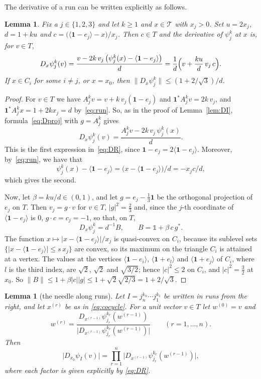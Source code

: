 \documentclass[11pt]{amsart}
\newcommand{\id}{\mathds{1}}
\newtheorem{lemma}[proposition]{Lemma}
\theoremstyle{definition}
\theoremstyle{remark}
\newcommand{\one}{\mathbf 1}
\newcommand{\cT}{\mathcal T}
\newcommand{\abs}[1]{\lvert #1\rvert}
\newcommand{\norm}[1]{\lVert #1\rVert}
\newcommand{\pr}[1]{\langle #1\rangle}
\begin{document}
The derivative of a run can be written explicitly as follows.

\begin{lemma}\label{lem:contraction}
    Fix a $j\in\{1,2,3\}$ and let $k\ge1$ and $x\in\cT$ with $x_j>0$. 
    Set $u=2x_j$, $d=1+ku$ and $c=\bigl(\pr{\one-e_j}-x\bigr)/x_j$. 
    Then $c\in T$ and the derivative of $\psi_j^k$ at $x$ is, for $v\in T$,
\begin{equation}\label{eq:DR}
  D_x\psi_j^k(v)=\frac{v-2k\,v_j\,\bigl(\psi_j^k(x)-\pr{\one-e_j}\bigr)}{d}
  =\frac1d\Bigl(v+\frac{ku}{d}\,v_j\,c\Bigr).
\end{equation}
    If $x\in C_i$ for some $i\neq j$, or $x=x_0$, then $\norm{D_x\psi_j^k}\le(1+2/\sqrt3)/d$.
\end{lemma}

\begin{proof}
    For $v\in T$ we have $A_j^kv=v+k\,v_j(\one-e_j)$ and $\one^*A_j^kv=2k\,v_j$, and $\one^*A_j^kx=1+2kx_j=d$ by~\eqref{eq:run}. 
    So, as in the proof of Lemma~\ref{lem:DI}, formula~\eqref{eq:Dproj} with $g=A_j^k$ gives 
    \[
    D_x\psi_j^k(v)=\frac{A_j^kv-2k\,v_j\,\psi_j^k(x)}{d}. 
    \]
    This is the first expression in~\eqref{eq:DR}, since $\one-e_j=2\pr{\one-e_j}$. 
    Moreover, by~\eqref{eq:run}, we have that 
    \[
    \psi_j^k(x)-\pr{\one-e_j}=\bigl(x-\pr{\one-e_j}\bigr)/d=-x_jc/d,
    \]
    which gives the second.

    Now, let $\beta=ku/d\in(0,1)$, and let $g=e_j-\frac13\one$ be the orthogonal projection of $e_j$ on $T$.
    Then $v_j=g\cdot v$ for $v\in T$, $\abs g^2=\frac23$ and, since the $j$-th coordinate of $\pr{\one-e_j}$ is $0$, $g\cdot c=c_j=-1$, so that, on $T$,
\begin{equation}\label{eq:DRB}
  D_x\psi_j^k=d^{-1}B,\qquad B=\id+\beta\,c\,g^* .
\end{equation}
    The function $x\mapsto\abs{x-\pr{\one-e_j}}/x_j$ is quasi-convex on $C_i$, because its sublevel sets $\{\abs{x-\pr{\one-e_j}}\le s\,x_j\}$ are convex, so its maximum on the triangle $C_i$ is attained at a vertex. 
    The values at the vertices $\pr{\one-e_i}$, $\pr{\one+e_l}$ and $\pr{\one+e_j}$ of $C_i$, where $l$ is the third index, are $\sqrt2$, $\sqrt2$ and $\sqrt{3/2}$; hence $\abs c^2\le2$ on $C_i$, and $\abs c^2=\frac32$ at $x_0$. So $\norm B\le1+\beta\abs c\abs g\le1+\sqrt2\sqrt{2/3}=1+2/\sqrt3$.
\end{proof}

\begin{lemma}[the needle along runs]\label{lem:Dcocycle}
Let $I=j_n^{k_n}\cdots j_1^{k_1}$ be written in runs from the right, and let $x^{(r)}$ be
as in \eqref{eq:cocycle}. For a unit vector $v\in T$ let $w^{(0)}=v$ and
\[
  w^{(r)}=\frac{D_{x^{(r-1)}}\psi_{j_r}^{k_r}(w^{(r-1)})}{\abs{D_{x^{(r-1)}}\psi_{j_r}^{k_r}(w^{(r-1)})}}
  \qquad(r=1,\dots,n).
\]
Then
\[
  \abs{D_{x_0}\psi_I(v)}=\prod_{r=1}^n\abs{D_{x^{(r-1)}}\psi_{j_r}^{k_r}(w^{(r-1)})} ,
\]
where each factor is given explicitly by \eqref{eq:DR}.
\end{lemma}
\end{document}
